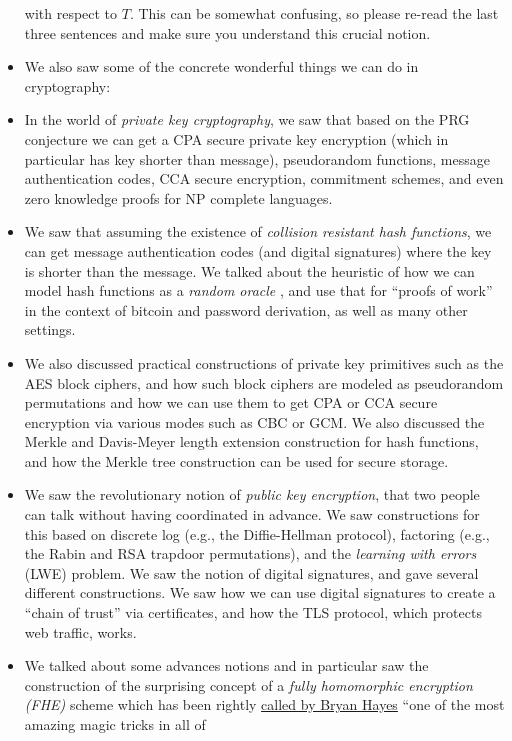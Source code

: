 \begin{itemize}
  with respect to \(T\). This can be somewhat confusing, so please
  re-read the last three sentences and make sure you understand this
  crucial notion.
\item
  We also saw some of the concrete wonderful things we can do in
  cryptography:
\item
  In the world of \emph{private key cryptography}, we saw that based on
  the PRG conjecture we can get a CPA secure private key encryption
  (which in particular has key shorter than message), pseudorandom
  functions, message authentication codes, CCA secure encryption,
  commitment schemes, and even zero knowledge proofs for NP complete
  languages.
\item
  We saw that assuming the existence of \emph{collision resistant hash
  functions}, we can get message authentication codes (and digital
  signatures) where the key is shorter than the message. We talked about
  the heuristic of how we can model hash functions as a \emph{random
  oracle} , and use that for ``proofs of work'' in the context of
  bitcoin and password derivation, as well as many other settings.
\item
  We also discussed practical constructions of private key primitives
  such as the AES block ciphers, and how such block ciphers are modeled
  as pseudorandom permutations and how we can use them to get CPA or CCA
  secure encryption via various modes such as CBC or GCM. We also
  discussed the Merkle and Davis-Meyer length extension construction for
  hash functions, and how the Merkle tree construction can be used for
  secure storage.
\item
  We saw the revolutionary notion of \emph{public key encryption}, that
  two people can talk without having coordinated in advance. We saw
  constructions for this based on discrete log (e.g., the Diffie-Hellman
  protocol), factoring (e.g., the Rabin and RSA trapdoor permutations),
  and the \emph{learning with errors} (LWE) problem. We saw the notion
  of digital signatures, and gave several different constructions. We
  saw how we can use digital signatures to create a ``chain of trust''
  via certificates, and how the TLS protocol, which protects web
  traffic, works.
\item
  We talked about some advances notions and in particular saw the
  construction of the surprising concept of a \emph{fully homomorphic
  encryption (FHE)} scheme which has been rightly
  \href{http://bit-player.org/2012/computing-with-encrypted-data}{called
  by Bryan Hayes} ``one of the most amazing magic tricks in all of

\end{itemize}
